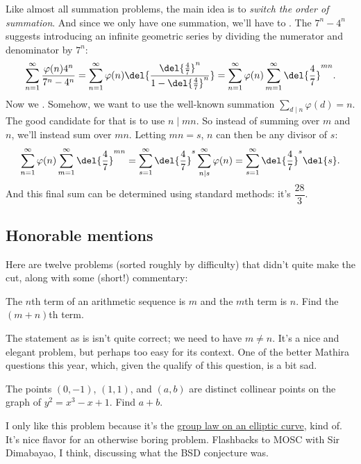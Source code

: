 \documentclass[11pt,paper=letter]{scrartcl}
\begin{document}
Like almost all summation problems, the main idea is to \emph{switch the order of summation}. And since we only have one summation, we'll have to . The $7^n - 4^n$ suggests introducing an infinite geometric series by dividing the numerator and denominator by $7^n$:
$$\sum_{n=1}^{\infty} \frac{\varphi(n)4^n}{7^n - 4^n} = \sum_{n=1}^{\infty} \varphi(n) \del{\frac{\del{\frac47}^n}{1 - \del{\frac47}^n}} = \sum_{n=1}^{\infty} \varphi(n) \sum_{m=1}^{\infty} \del{\frac47}^{mn}.$$
Now we . Somehow, we want to use the well-known summation $\sum_{d\mid n}\varphi(d) = n$. The good candidate for that is to use $n \mid mn$. So instead of summing over $m$ and $n$, we'll instead sum over $mn$. Letting $mn = s$, $n$ can then be any divisor of $s$:
$$\sum_{n=1}^{\infty} \varphi(n) \sum_{m=1}^{\infty} \del{\frac47}^{mn} = \sum_{s=1}^{\infty} \del{\frac47}^{s} \sum_{n \mid s}^{\infty} \varphi(n) = \sum_{s=1}^{\infty} \del{\frac47}^{s}\del{s}.$$
And this final sum can be determined using standard methods: it's $\dfrac{28}{3}$.

\subsection{Honorable mentions}

Here are twelve problems (sorted roughly by difficulty) that didn't quite make the cut, along with some (short!) commentary:

\begin{probboxed}
   The $n$th term of an arithmetic sequence is $m$ and the $m$th term is $n$. Find the $(m+n)$th term.
\end{probboxed}

The statement as is isn't quite correct; we need to have $m \neq n$. It's a nice and elegant problem, but perhaps too easy for its context. One of the better Mathira questions this year, which, given the qualify of this question, is a bit sad.

\begin{probboxed}
   The points $(0, -1)$, $(1, 1)$, and $(a, b)$ are distinct collinear points on the graph of $y^2 = x^3 - x + 1$. Find $a + b$.
\end{probboxed}

I only like this problem because it's the \href{https://en.wikipedia.org/wiki/Elliptic_curve\#The_group_law}{group law on an elliptic curve}, kind of. It's nice flavor for an otherwise boring problem. Flashbacks to MOSC with Sir Dimabayao, I think, discussing what the BSD conjecture was. 
\end{document}
